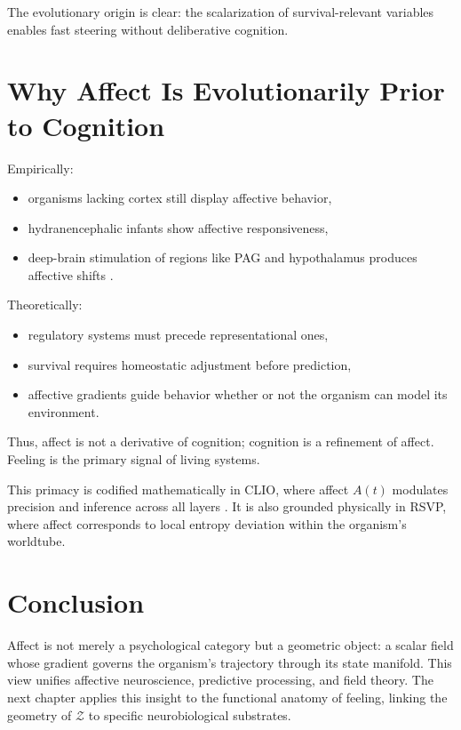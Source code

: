 \documentclass[12pt,oneside]{book}
\theoremstyle{plain}
\theoremstyle{definition}
\let\citep\parencite
\begin{document}
The evolutionary origin is clear:
the scalarization of survival-relevant variables enables fast steering without
deliberative cognition.

\section{Why Affect Is Evolutionarily Prior to Cognition}

Empirically:
\begin{itemize}
    \item organisms lacking cortex still display affective behavior,
    \item hydranencephalic infants show affective responsiveness,
    \item deep-brain stimulation of regions like PAG and hypothalamus produces
          affective shifts \citep{solms2021hidden}.
\end{itemize}

Theoretically:
\begin{itemize}
    \item regulatory systems must precede representational ones,
    \item survival requires homeostatic adjustment before prediction,
    \item affective gradients guide behavior whether or not the organism can
          model its environment.
\end{itemize}

Thus, affect is not a derivative of cognition; cognition is a refinement of
affect.
Feeling is the primary signal of living systems.

This primacy is codified mathematically in CLIO, where affect $A(t)$ modulates
precision and inference across all layers
\citep{cheng2025cognitive}.
It is also grounded physically in RSVP, where affect corresponds to local
entropy deviation within the organism’s worldtube.

\section{Conclusion}

Affect is not merely a psychological category but a geometric object: a scalar
field whose gradient governs the organism’s trajectory through its state
manifold.
This view unifies affective neuroscience, predictive processing, and field
theory.
The next chapter applies this insight to the functional anatomy of feeling,
linking the geometry of $\mathcal{Z}$ to specific neurobiological substrates.
\end{document}
